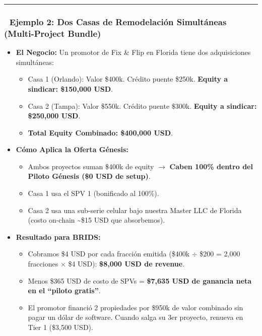 \documentclass[
]{article}
\providecommand{\tightlist}{%
  \setlength{\itemsep}{0pt}\setlength{\parskip}{0pt}}
\begin{document}
\begin{center}\rule{0.5\linewidth}{0.5pt}\end{center}

\subsubsection{🏡 Ejemplo 2: Dos Casas de Remodelación Simultáneas
(Multi-Project
Bundle)}\label{ejemplo-2-dos-casas-de-remodelaciuxf3n-simultuxe1neas-multi-project-bundle}

\begin{itemize}
\tightlist
\item
  \textbf{El Negocio:} Un promotor de Fix \& Flip en Florida tiene dos
  adquisiciones simultáneas:

  \begin{itemize}
  \tightlist
  \item
    Casa 1 (Orlando): Valor \$400k. Crédito puente \$250k.
    \textbf{Equity a sindicar: \$150,000 USD}.
  \item
    Casa 2 (Tampa): Valor \$550k. Crédito puente \$300k. \textbf{Equity
    a sindicar: \$250,000 USD}.
  \item
    \textbf{Total Equity Combinado: \$400,000 USD}.
  \end{itemize}
\item
  \textbf{Cómo Aplica la Oferta Génesis:}

  \begin{itemize}
  \tightlist
  \item
    Ambos proyectos suman \$400k de equity \(\rightarrow\) \textbf{Caben
    100\% dentro del Piloto Génesis (\$0 USD de setup)}.
  \item
    Casa 1 usa el SPV 1 (bonificado al 100\%).
  \item
    Casa 2 usa una sub-serie celular bajo nuestra Master LLC de Florida
    (costo on-chain \textasciitilde\$15 USD que absorbemos).
  \end{itemize}
\item
  \textbf{Resultado para BRIDS:}

  \begin{itemize}
  \tightlist
  \item
    Cobramos \$4 USD por cada fracción emitida (\$400k \(\div\) \$200 =
    2,000 fracciones \(\times\) \$4 USD): \textbf{\$8,000 USD de
    revenue}.
  \item
    Menos \$365 USD de costo de SPVs = \textbf{\$7,635 USD de ganancia
    neta en el ``piloto gratis''}.
  \item
    El promotor financió 2 propiedades por \$950k de valor combinado sin
    pagar un dólar de software. Cuando salga su 3er proyecto, renueva en
    Tier 1 (\$3,500 USD).
  \end{itemize}
\end{itemize}
\end{document}
